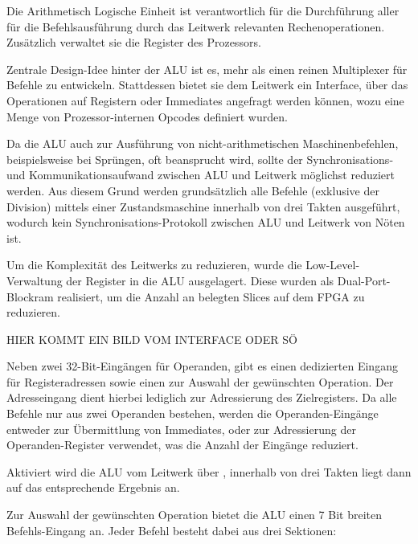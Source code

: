 \label{ch:alu}

Die Arithmetisch Logische Einheit ist verantwortlich f\"ur die Durchf\"uhrung aller f\"ur die Befehlsausf\"uhrung durch das Leitwerk relevanten Rechenoperationen. Zus\"atzlich verwaltet sie die Register des Prozessors.


Zentrale Design-Idee hinter der ALU ist es, mehr als einen reinen Multiplexer f\"ur Befehle zu entwickeln. Stattdessen bietet sie dem Leitwerk ein Interface,
\"uber das Operationen auf Registern oder Immediates angefragt werden k\"onnen, wozu eine Menge von Prozessor-internen Opcodes definiert wurden.

Da die ALU auch zur Ausf\"uhrung von nicht-arithmetischen Maschinenbefehlen, beispielsweise bei Spr\"ungen, oft beansprucht wird, sollte der Synchronisations- und Kommunikationsaufwand zwischen ALU und Leitwerk m\"oglichst reduziert werden.
Aus diesem Grund werden grunds\"atzlich alle Befehle (exklusive der Division) mittels einer Zustandsmaschine innerhalb von drei Takten ausgef\"uhrt, wodurch kein Synchronisations-Protokoll zwischen ALU und Leitwerk von N\"oten ist.

Um die Komplexit\"at des Leitwerks zu reduzieren, wurde die Low-Level-Verwaltung der Register in die ALU ausgelagert. Diese wurden als Dual-Port-Blockram realisiert, um die Anzahl an belegten Slices auf dem FPGA zu reduzieren.

HIER KOMMT EIN BILD VOM INTERFACE ODER S\"O

Neben zwei 32-Bit-Eing\"angen f\"ur Operanden, gibt es einen dedizierten Eingang f\"ur Registeradressen sowie einen zur Auswahl der gew\"unschten Operation. 
Der Adresseingang dient hierbei lediglich zur Adressierung des Zielregisters. Da alle Befehle nur aus zwei Operanden bestehen, werden die Operanden-Eing\"ange entweder zur \"Ubermittlung von Immediates, oder zur Adressierung der Operanden-Register verwendet, was die Anzahl der Eing\"ange reduziert.

Aktiviert wird die ALU vom Leitwerk \"uber , innerhalb von drei Takten liegt dann auf  das entsprechende Ergebnis an.

Zur Auswahl der gew\"unschten Operation bietet die ALU einen 7 Bit breiten Befehls-Eingang an.
Jeder Befehl besteht dabei aus drei Sektionen\vspace{10pt}:

\vspace{5pt}

